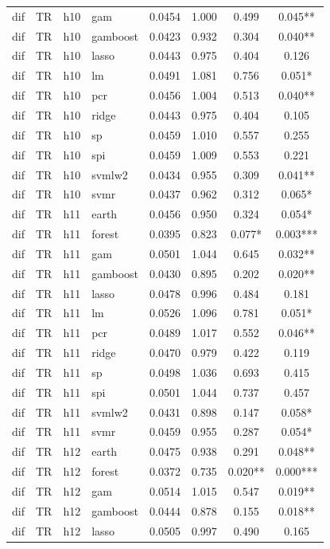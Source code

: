 \begin{ThreePartTable}
\begin{longtable}[t]{llclcccc}
dif & TR & h10 & gam & 0.0454 & 1.000 & 0.499 & 0.045**\\
dif & TR & h10 & gamboost & 0.0423 & 0.932 & 0.304 & 0.040**\\
dif & TR & h10 & lasso & 0.0443 & 0.975 & 0.404 & 0.126\\
dif & TR & h10 & lm & 0.0491 & 1.081 & 0.756 & 0.051*\\
dif & TR & h10 & pcr & 0.0456 & 1.004 & 0.513 & 0.040**\\
dif & TR & h10 & ridge & 0.0443 & 0.975 & 0.404 & 0.105\\
dif & TR & h10 & sp & 0.0459 & 1.010 & 0.557 & 0.255\\
dif & TR & h10 & spi & 0.0459 & 1.009 & 0.553 & 0.221\\
dif & TR & h10 & svmlw2 & 0.0434 & 0.955 & 0.309 & 0.041**\\
dif & TR & h10 & svmr & 0.0437 & 0.962 & 0.312 & 0.065*\\
\addlinespace
dif & TR & h11 & earth & 0.0456 & 0.950 & 0.324 & 0.054*\\
dif & TR & h11 & forest & 0.0395 & 0.823 & 0.077* & 0.003***\\
dif & TR & h11 & gam & 0.0501 & 1.044 & 0.645 & 0.032**\\
dif & TR & h11 & gamboost & 0.0430 & 0.895 & 0.202 & 0.020**\\
dif & TR & h11 & lasso & 0.0478 & 0.996 & 0.484 & 0.181\\
dif & TR & h11 & lm & 0.0526 & 1.096 & 0.781 & 0.051*\\
dif & TR & h11 & pcr & 0.0489 & 1.017 & 0.552 & 0.046**\\
dif & TR & h11 & ridge & 0.0470 & 0.979 & 0.422 & 0.119\\
dif & TR & h11 & sp & 0.0498 & 1.036 & 0.693 & 0.415\\
dif & TR & h11 & spi & 0.0501 & 1.044 & 0.737 & 0.457\\
dif & TR & h11 & svmlw2 & 0.0431 & 0.898 & 0.147 & 0.058*\\
dif & TR & h11 & svmr & 0.0459 & 0.955 & 0.287 & 0.054*\\
\addlinespace
dif & TR & h12 & earth & 0.0475 & 0.938 & 0.291 & 0.048**\\
dif & TR & h12 & forest & 0.0372 & 0.735 & 0.020** & 0.000***\\
dif & TR & h12 & gam & 0.0514 & 1.015 & 0.547 & 0.019**\\
dif & TR & h12 & gamboost & 0.0444 & 0.878 & 0.155 & 0.018**\\
dif & TR & h12 & lasso & 0.0505 & 0.997 & 0.490 & 0.165\\

\end{longtable}
\end{ThreePartTable}
